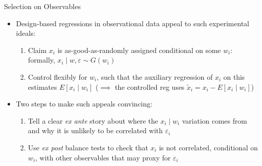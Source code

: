 \documentclass[11pt, english]{beamer}
\begin{document}
	\begin{frame}{Selection on Observables}
		\begin{itemize}
			\item Design-based regressions in observational data appeal to such experimental
				ideals:
				\smallskip
				\begin{enumerate}
					\item Claim $x_{i}$ is as-good-as-randomly assigned conditional on some
						$w_{i}$: formally, $x_{i} \mid w,\varepsilon \sim G(w_{i})$
						\smallskip
						\pause{}

					\item Control flexibly for $w_{i}$, such that the auxiliary regression
						of $x_{i}$ on this estimates $E[x_{i}\mid w_{i}]$ ($\implies$ the controlled
						reg uses $\tilde{x}_{i}=x_{i}-E[x_{i}\mid w_{i}]$)
				\end{enumerate}
				\bigskip
				\pause{}

			\item Two steps to make such appeals convincing:
				\smallskip
				\pause{}
				\begin{enumerate}
					\item Tell a clear \emph{ex ante} story about where the
						$x_{i}\mid w_{i}$ variation comes from and why it is unlikely to be
						correlated with $\varepsilon_{i}$
						\smallskip
						\pause{}

					\item Use \emph{ex post} balance tests to check that $x_{i}$ is not
						correlated, conditional on $w_{i}$, with other observables that may
						proxy for $\varepsilon_{i}$
				\end{enumerate}
		\end{itemize}
	\end{frame}
\end{document}

